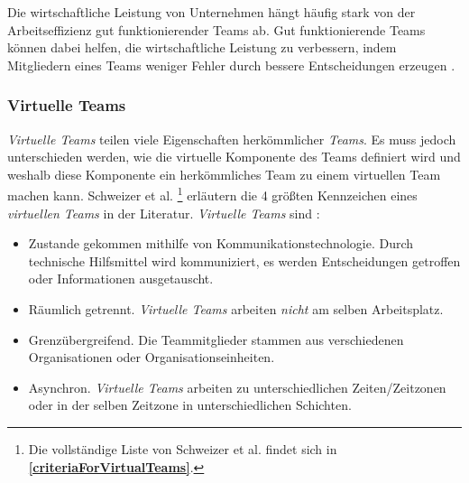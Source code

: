 \documentclass[a4paper,11pt]{article}%
\renewcommand{\\}{\vspace*{0.5\baselineskip} \newline}
\begin{document}
Die wirtschaftliche Leistung von Unternehmen hängt häufig stark von der Arbeitseffizienz gut funktionierender Teams ab. Gut funktionierende Teams können dabei helfen, die wirtschaftliche Leistung zu verbessern, indem Mitgliedern eines Teams weniger Fehler durch bessere Entscheidungen erzeugen \citep[S. 1-6]{biech2007pfeiffer}. 
 
%

		


\subsubsection{Virtuelle Teams}
\label{vts}

\textit{Virtuelle Teams} teilen viele Eigenschaften herkömmlicher \textit{Teams}. Es muss jedoch unterschieden werden, wie die virtuelle Komponente des Teams definiert wird und weshalb diese Komponente ein herkömmliches Team zu einem virtuellen Team machen kann. 
\label{AnforderungenLautSchweitzer}
Schweizer et al. \citep[S.270]{schweitzer2010conceptualizing}\footnote{Die vollständige Liste von Schweizer et al. findet sich in \textbf{\autoref{criteriaForVirtualTeams}}.} erläutern die 4 größten Kennzeichen eines \textit{virtuellen Teams} in der Literatur.
\textit{Virtuelle Teams} sind :
\begin{itemize}
\item Zustande gekommen mithilfe von Kommunikationstechnologie. Durch technische Hilfsmittel wird kommuniziert, es werden Entscheidungen getroffen oder Informationen ausgetauscht.
\item Räumlich getrennt. \textit{Virtuelle Teams} arbeiten \textit{nicht} am selben Arbeitsplatz.
\item Grenzübergreifend. Die Teammitglieder stammen aus verschiedenen Organisationen oder Organisationseinheiten.
\item Asynchron. \textit{Virtuelle Teams} arbeiten zu unterschiedlichen Zeiten/Zeitzonen oder in der selben Zeitzone in unterschiedlichen Schichten.
\end{itemize}
\end{document}
